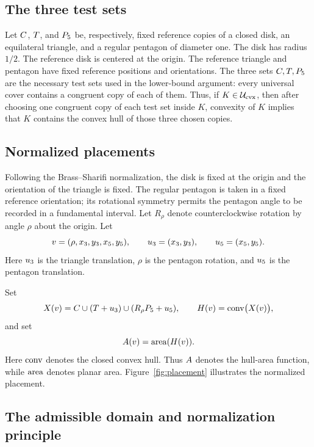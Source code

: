 \documentclass[11pt]{article}
\begin{document}
\subsection{The three test sets}

Let \(C\), \(T\), and \(P_5\) be, respectively, fixed reference copies of a closed disk, an equilateral triangle, and a regular pentagon of diameter one.  The disk has radius \(1/2\).  The reference disk is centered at the origin.  The reference triangle and pentagon have fixed reference positions and orientations.  The three sets \(C,T,P_5\) are the necessary test sets used in the lower-bound argument: every universal cover contains a congruent copy of each of them.  Thus, if \(K\in\mathcal{U}_{\mathrm{cvx}}\), then after choosing one congruent copy of each test set inside \(K\), convexity of \(K\) implies that \(K\) contains the convex hull of those three chosen copies.

\subsection{Normalized placements}

Following the Brass--Sharifi normalization, the disk is fixed at the origin and the orientation of the triangle is fixed.  The regular pentagon is taken in a fixed reference orientation; its rotational symmetry permits the pentagon angle to be recorded in a fundamental interval.  Let \(R_\rho\) denote counterclockwise rotation by angle \(\rho\) about the origin.  Let
\[
v=(\rho,x_3,y_3,x_5,y_5),\qquad
u_3=(x_3,y_3),\qquad
u_5=(x_5,y_5).
\]
Here \(u_3\) is the triangle translation, \(\rho\) is the pentagon rotation, and \(u_5\) is the pentagon translation.

Set
\[
X(v)=C\cup(T+u_3)\cup(R_\rho P_5+u_5),
\qquad
H(v)=\operatorname{conv}\bigl(X(v)\bigr),
\]
and set
\[
A(v)=\operatorname{area}(H(v)).
\]
Here \(\operatorname{conv}\) denotes the closed convex hull.  Thus \(A\) denotes the hull-area function, while \(\operatorname{area}\) denotes planar area.  Figure~\ref{fig:placement} illustrates the normalized placement.


\FloatBarrier

\subsection{The admissible domain and normalization principle}
\end{document}

